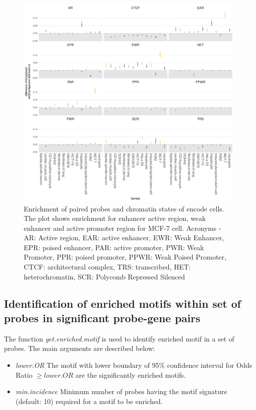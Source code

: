 \begin{figure}[ht!]
\centering
\includegraphics[width=1.0\textwidth]{images/funcivar.pdf}
\caption[ Enrichment of paired probes and chromatin states of encode cells.]{\label{fig:funcivar} Enrichment of paired probes and chromatin states of encode cells.
The plot shows enrichment for enhancer active region, weak enhancer  and active
promoter region for MCF-7 cell. Acronyms - AR: Active region, EAR: active enhancer,
 EWR: Weak Enhancer, EPR: poised enhancer, PAR: active promoter, PWR: Weak Promoter,
 PPR: poised promoter, PPWR: Weak Poised Promoter, CTCF: architectural complex,
 TRS: transcribed, HET: heterochromatin, SCR: Polycomb Repressed Silenced}
\end{figure}



\subsection*{Identification of enriched motifs within set of probes in significant probe-gene pairs}
The function \textit{get.enriched.motif} is used to identify enriched motif in a set of probes.
The main arguments are described below:
\begin{itemize}
\item \textit{lower.OR}	 The motif with lower boundary of 95\% confidence interval for Odds Ratio $\geq lower.OR$  are the significantly enriched motifs.
\item \textit{min.incidence} Minimum number of probes having the motif signature (default: 10) required for a motif to be enriched.
\end{itemize}

